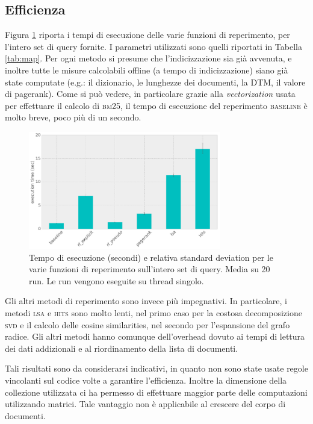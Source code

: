 \subsection{Efficienza}
\label{sec:efficienza}
Figura \ref{fig:efficiency} riporta i tempi di esecuzione delle varie funzioni di reperimento, per l'intero set di query fornite. I parametri utilizzati sono quelli riportati in Tabella \ref{tab:map}. Per ogni metodo si presume che l'indicizzazione sia gi\`a avvenuta, e inoltre tutte le misure calcolabili offline (a tempo di indicizzazione) siano gi\`a state computate (e.g.: il dizionario, le lunghezze dei documenti, la DTM, il valore di pagerank). Come si pu\`o vedere, in particolare grazie alla \textit{vectorization} usata per effettuare il calcolo di \textsc{bm25}, il tempo di esecuzione del reperimento \textsc{baseline} \`e molto breve, poco pi\`u di un secondo. 
\begin{figure}[htpb]
	\begin{center}
		\includegraphics[width=0.75\textwidth]{figures/efficiency.png}
		\caption{Tempo di esecuzione (secondi) e relativa standard deviation per le varie funzioni di reperimento sull'intero set di query. Media su 20 run. Le run vengono eseguite su thread singolo.}
		\label{fig:efficiency}
	\end{center}
\end{figure}
Gli altri metodi di reperimento sono invece pi\`u impegnativi. In particolare, i metodi \textsc{lsa} e \textsc{hits} sono molto lenti, nel primo caso per la costosa decomposizione \textsc{svd} e il calcolo delle cosine similarities, nel secondo per l'espansione del grafo radice. Gli altri metodi hanno comunque dell'overhead dovuto ai tempi di lettura dei dati addizionali e al riordinamento della lista di documenti.

Tali risultati sono da considerarsi indicativi, in quanto non sono state usate regole vincolanti sul codice volte a garantire l'efficienza. Inoltre la dimensione della collezione  utilizzata ci ha permesso di effettuare maggior parte delle computazioni utilizzando matrici. Tale vantaggio non \`e applicabile al crescere del corpo di documenti.

